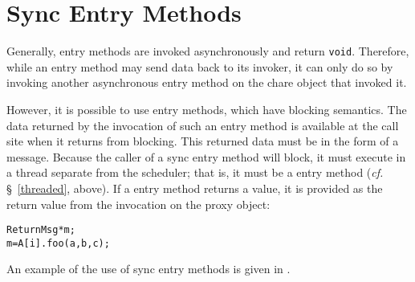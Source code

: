 
\section{Sync Entry Methods}
\label{sync}

Generally, entry methods are invoked asynchronously and return {\tt void}. Therefore,
while an entry method may send data back to its invoker, it can only do so by invoking
another asynchronous entry method on the chare object that invoked it.

However, it is possible to use  entry methods, which have blocking
semantics. The data returned by the invocation of such an entry method is
available at the call site when it returns from blocking. This returned data
must be in the form of a \charmpp message. Because the caller of a sync entry
method will block, it must execute in a thread separate from the scheduler;
that is, it must be a  entry method ({\em cf.} \S~\ref{threaded},
above).  If a  entry method returns a value, it is provided as the
return value from the invocation on the proxy object:

\begin{alltt}
 ReturnMsg* m;
 m = A[i].foo(a, b, c);
\end{alltt}

An example of the use of sync entry methods is given in .

